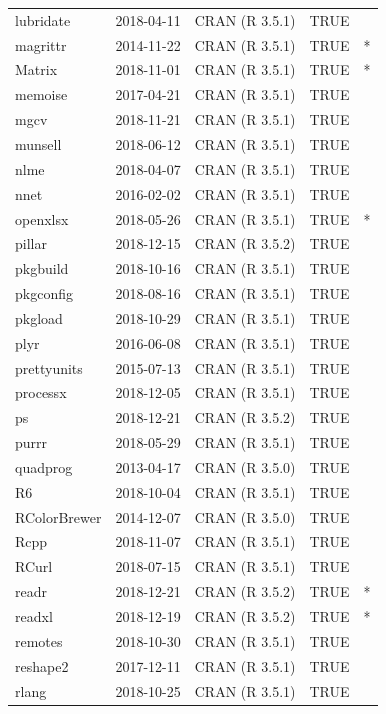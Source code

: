 \documentclass{grattan}\usepackage[]{graphicx}\usepackage[]{color}
\begin{document}
\begin{longtable}{lllll}
  lubridate & 2018-04-11 & CRAN (R 3.5.1) & TRUE &  \\ 
  magrittr & 2014-11-22 & CRAN (R 3.5.1) & TRUE & * \\ 
  Matrix & 2018-11-01 & CRAN (R 3.5.1) & TRUE & * \\ 
  memoise & 2017-04-21 & CRAN (R 3.5.1) & TRUE &  \\ 
  mgcv & 2018-11-21 & CRAN (R 3.5.1) & TRUE &  \\ 
  munsell & 2018-06-12 & CRAN (R 3.5.1) & TRUE &  \\ 
  nlme & 2018-04-07 & CRAN (R 3.5.1) & TRUE &  \\ 
  nnet & 2016-02-02 & CRAN (R 3.5.1) & TRUE &  \\ 
  openxlsx & 2018-05-26 & CRAN (R 3.5.1) & TRUE & * \\ 
  pillar & 2018-12-15 & CRAN (R 3.5.2) & TRUE &  \\ 
  pkgbuild & 2018-10-16 & CRAN (R 3.5.1) & TRUE &  \\ 
  pkgconfig & 2018-08-16 & CRAN (R 3.5.1) & TRUE &  \\ 
  pkgload & 2018-10-29 & CRAN (R 3.5.1) & TRUE &  \\ 
  plyr & 2016-06-08 & CRAN (R 3.5.1) & TRUE &  \\ 
  prettyunits & 2015-07-13 & CRAN (R 3.5.1) & TRUE &  \\ 
  processx & 2018-12-05 & CRAN (R 3.5.1) & TRUE &  \\ 
  ps & 2018-12-21 & CRAN (R 3.5.2) & TRUE &  \\ 
  purrr & 2018-05-29 & CRAN (R 3.5.1) & TRUE &  \\ 
  quadprog & 2013-04-17 & CRAN (R 3.5.0) & TRUE &  \\ 
  R6 & 2018-10-04 & CRAN (R 3.5.1) & TRUE &  \\ 
  RColorBrewer & 2014-12-07 & CRAN (R 3.5.0) & TRUE &  \\ 
  Rcpp & 2018-11-07 & CRAN (R 3.5.1) & TRUE &  \\ 
  RCurl & 2018-07-15 & CRAN (R 3.5.1) & TRUE &  \\ 
  readr & 2018-12-21 & CRAN (R 3.5.2) & TRUE & * \\ 
  readxl & 2018-12-19 & CRAN (R 3.5.2) & TRUE & * \\ 
  remotes & 2018-10-30 & CRAN (R 3.5.1) & TRUE &  \\ 
  reshape2 & 2017-12-11 & CRAN (R 3.5.1) & TRUE &  \\ 
  rlang & 2018-10-25 & CRAN (R 3.5.1) & TRUE &  \\ 

\end{longtable}
\end{document}
